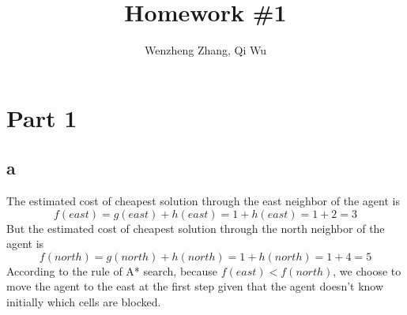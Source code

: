 \documentclass[11pt]{article}
\title{Homework \#1} %
\author{Wenzheng Zhang, Qi Wu} %
\begin{document}
\maketitle %


\section*{Part 1}





\subsection*{a}
 The estimated cost of cheapest solution through the east neighbor of the agent is
 $$f(east)=g(east)+h(east)=1+h(east)=1+2=3$$ 
 But the estimated cost of cheapest solution through the north neighbor of the agent is $$f(north)=g(north)+h(north)=1+h(north)=1+4=5$$ 
 According to the rule of A* search, because $f(east)<f(north)$, we choose to move the agent to  the east at the first step given that the agent doesn't know initially which cells are blocked.
\end{document}
